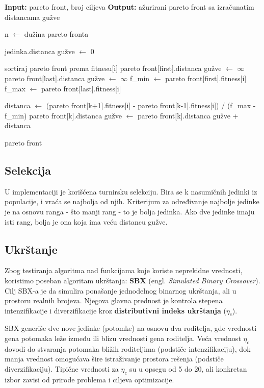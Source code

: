 \documentclass[12pt]{article}
\begin{document}
\begin{algorithmic}[1]
\STATE \textbf{Input:} pareto front, broj ciljeva
\STATE \textbf{Output:} ažurirani pareto front sa izračunatim distancama gužve

\STATE n $\gets$ dužina pareto fronta

    \STATE jedinka.distanca gužve $\gets$ 0
\ENDFOR

    \STATE sortiraj pareto front prema fitnesu[i]
    \STATE pareto front[first].distanca gužve $\gets$ \(\infty\)
    \STATE pareto front[last].distanca gužve $\gets$ \(\infty\)
    \STATE f\_min $\gets$ pareto front[first].fitness[i]
    \STATE f\_max $\gets$ pareto front[last].fitness[i]

        \STATE distanca $\gets$ (pareto front[k+1].fitness[i] - pareto front[k-1].fitness[i]) / (f\_max - f\_min)
        \STATE pareto front[k].distanca gužve $\gets$ pareto front[k].distanca gužve + distanca
    \ENDFOR
\ENDFOR

\RETURN pareto front
\end{algorithmic}

\subsection{Selekcija}
U implementaciji je korišćena turnirsku selekciju. Bira se k nasumičnih jedinki iz populacije, i vraća se najbolja od njih. Kriterijum za određivanje najbolje jedinke je na osnovu ranga - što manji rang - to je bolja jedinka. Ako dve jedinke imaju isti rang, bolja je ona koja ima veću distancu gužve.

\subsection{Ukrštanje}
Zbog testiranja algoritma nad funkcijama koje koriste neprekidne vrednosti, koristimo poseban algoritam ukrštanja: \textbf{SBX} (engl. \textit{Simulated Binary Crossover}). 
Cilj SBX-a je da simulira ponašanje jednodelnog binarnog ukrštanja, ali u prostoru realnih brojeva. Njegova glavna prednost je kontrola stepena intenzifikacije i diverzifikacije kroz \textbf{distributivni indeks ukrštanja} ($\eta_c$). 

SBX generiše dve nove jedinke (potomke) na osnovu dva roditelja, gde vrednosti gena potomaka leže između ili blizu vrednosti gena roditelja. Veća vrednost $\eta_c$ dovodi do stvaranja potomaka bližih roditeljima (podstiče intenzifikaciju), dok manja vrednost omogućava šire istraživanje prostora rešenja (podstiče diverzifikaciju).
Tipične vrednosti za $\eta_c$ su u opsegu od 5 do 20, ali konkretan izbor zavisi od prirode problema i ciljeva optimizacije.
\end{document}
